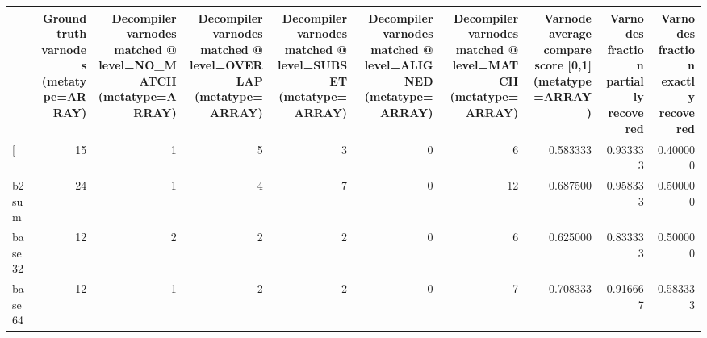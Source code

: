 \begin{tabular}{lrrrrrrrrr}
\toprule
{} &  Ground truth varnodes (metatype=ARRAY) &  Decompiler varnodes matched @ level=NO\_MATCH (metatype=ARRAY) &  Decompiler varnodes matched @ level=OVERLAP (metatype=ARRAY) &  Decompiler varnodes matched @ level=SUBSET (metatype=ARRAY) &  Decompiler varnodes matched @ level=ALIGNED (metatype=ARRAY) &  Decompiler varnodes matched @ level=MATCH (metatype=ARRAY) &  Varnode average compare score [0,1] (metatype=ARRAY) &  Varnodes fraction partially recovered &  Varnodes fraction exactly recovered \\
\midrule
[         &                                      15 &                                                  1 &                                                  5 &                                                  3 &                                                  0 &                                                  6 &                                           0.583333 &                               0.933333 &                             0.400000 \\
b2sum     &                                      24 &                                                  1 &                                                  4 &                                                  7 &                                                  0 &                                                 12 &                                           0.687500 &                               0.958333 &                             0.500000 \\
base32    &                                      12 &                                                  2 &                                                  2 &                                                  2 &                                                  0 &                                                  6 &                                           0.625000 &                               0.833333 &                             0.500000 \\
base64    &                                      12 &                                                  1 &                                                  2 &                                                  2 &                                                  0 &                                                  7 &                                           0.708333 &                               0.916667 &                             0.583333 \\

\end{tabular}
